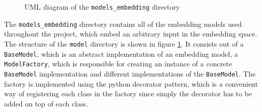 \begin{figure}[t]
{
    }
	\caption{UML diagram of the \texttt{models\_embedding} directory}
	\label{fig:UML-Models-Embedding}
\end{figure}
\noindent
The \texttt{models\_embedding} directory contains all of the embedding models used throughout the project, which embed an arbitrary input in the embedding space. The structure of the \texttt{model} directory is shown in figure \ref{fig:UML-Models-Embedding}. It consists out of a \texttt{BaseModel}, which is an abstract implementation of an embedding model, a \texttt{ModelFactory}, which is responsible for creating an instance of a concrete \texttt{BaseModel} implementation and different implementations of the \texttt{BaseModel}. The factory is implemented using the python decorator pattern, which is a convenient way of registering each class in the factory since simply the decorator has to be added on top of each class.
